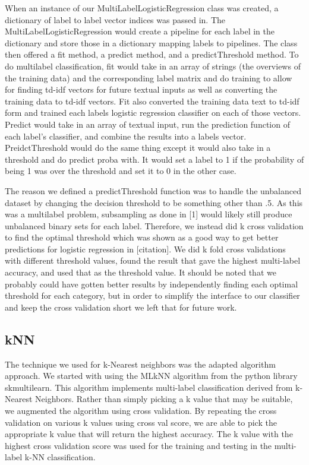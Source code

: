 \documentclass[sigconf]{acmart}
\begin{document}
When an instance of our MultiLabelLogisticRegression class was created, a dictionary of label to label vector indices was passed in.  The MultiLabelLogisticRegression would create a pipeline for each label in the dictionary and store those in a dictionary mapping labels to pipelines. The class then offered a fit method, a predict method, and a predictThreshold method. To do multilabel classification, fit would take in an array of strings (the overviews of the training data) and the corresponding label matrix and do training to allow for finding td-idf vectors for future textual inputs as well as converting the training data to td-idf vectors. Fit also converted the training data text to td-idf form and trained each labels logistic regression classifier on each of those vectors. Predict would take in an array of textual input, run the prediction function of each label's classifier, and combine the results into a labels vector.  PreidctThreshold would do the same thing except it would also take in a threshold and do predict proba with. It would set a label to 1 if the probability of being 1 was over the threshold and set it to 0 in the other case. 

The reason we defined a predictThreshold function was to handle the unbalanced dataset by changing the decision threshold to be something other than .5.  As this was a multilabel problem, subsampling as done in [1] would likely still produce unbalanced binary sets for each label.  Therefore, we instead did k cross validation to find the optimal threshold which was shown as a good way to get better predictions for logistic regression in [citation]. We did k fold cross validations with different threshold values, found the result that gave the highest multi-label accuracy, and used that as the threshold value.  It should be noted that we probably could have gotten better results by independently finding each optimal threshold for each category, but in order to simplify the interface to our classifier and keep the cross validation short we left that for future work. 

\subsection{kNN}
The technique we used for k-Nearest neighbors was the adapted algorithm approach. We started with using the MLkNN algorithm from the python library skmultilearn. This algorithm implements multi-label classification derived from k-Nearest Neighbors. Rather than simply picking a k value that may be suitable, we augmented the algorithm using cross validation. By repeating the cross validation on various k values using cross val score, we are able to pick the appropriate k value that will return the highest accuracy. The k value with the highest cross validation score was used for the training and testing in the multi-label k-NN classification. 
\end{document}

